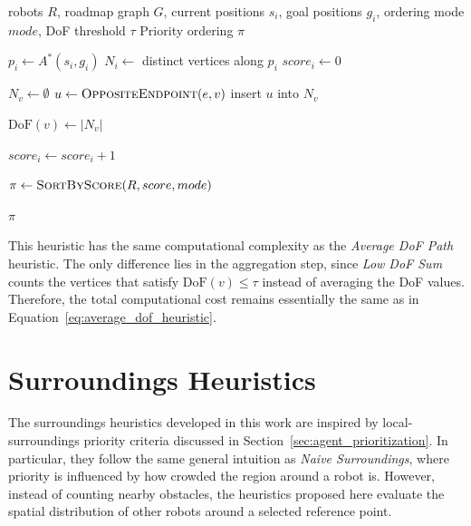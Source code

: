 \begin{algorithm}[H]
\caption{Low DoF Sum Heuristic}
\label{alg:low_dof_sum}
\footnotesize
{}
\begin{algorithmic}[1]
\Require robots \(R\), roadmap graph \(G\), current positions \(s_i\), goal positions \(g_i\), ordering mode \(mode\), DoF threshold \(\tau\)
\Ensure Priority ordering \(\pi\)

    \State \(p_i \gets A^*(s_i, g_i)\) 
    \State \(N_i \gets\) distinct vertices along \(p_i\)
    \State \(score_i \gets 0\)

        \State $N_v \gets \emptyset$ 
            \State $u \gets \textsc{OppositeEndpoint}(e, v)$ 
            \State insert $u$ into $N_v$
        \EndFor

        \State $\mathrm{DoF}(v) \gets |N_v|$ 

            \State $score_i \gets score_i + 1$ 
        \EndIf
    \EndFor
\EndFor

\State \(\pi \gets \textsc{SortByScore}(R, score, mode)\)

\State \Return \(\pi\)
\end{algorithmic}
\end{algorithm}

This heuristic has the same computational complexity as the \textit{Average DoF Path} heuristic. The only difference lies in the aggregation step, since \textit{Low DoF Sum} counts the vertices that satisfy \(\mathrm{DoF}(v) \leq \tau\) instead of averaging the DoF values. Therefore, the total computational cost remains essentially the same as in Equation~\ref{eq:average_dof_heuristic}.

\section{Surroundings Heuristics}
\label{sec:surroundings_heuristics}
\hspace{\parindent}
The surroundings heuristics developed in this work are inspired by local-surroundings priority
criteria discussed in Section~\ref{sec:agent_prioritization}. In particular, they follow the same
general intuition as \emph{Naive Surroundings}, where priority is influenced by how crowded the
region around a robot is. However, instead of counting nearby obstacles, the heuristics proposed
here evaluate the spatial distribution of other robots around a selected reference point.

